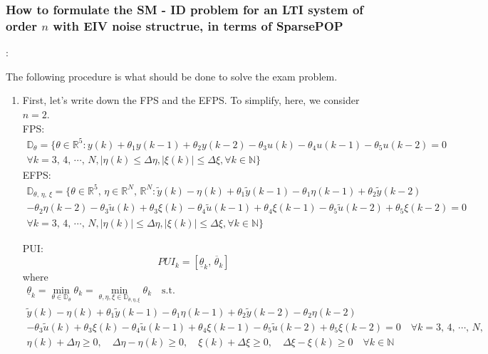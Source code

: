 \subsubsection{How to formulate the SM - ID problem for an LTI system of order $n$ with EIV noise structrue, in terms of SparsePOP}:\\
\begin{QandAbox}
The following procedure is what should be done to solve the exam problem.
\end{QandAbox}
\begin{enumerate}
\item First, let's write down the FPS and the EFPS. To simplify, here, we consider $n = 2$.\\
FPS:
\[
\begin{array}{c}
\mathbb{D}_\theta = \{\theta \in \mathbb{R}^5: y(k) + \theta_1 y(k-1) + \theta_2 y(k-2) - \theta_3 u(k) -\theta_4 u(k-1) -\theta_5 u(k-2) = 0 \\
\forall k = 3,\,4,\,\cdots,\,N, |\eta(k)\leq\Delta\eta, |\xi(k)|\leq \Delta\xi, \forall k \in \mathbb{N} 
\}
\end{array}
\]
EFPS:
\[
\begin{array}{l}
\mathbb{D}_{\theta,\,\eta,\,\xi}= \{\theta \in \mathbb{R}^5,\, \eta \in \mathbb{R}^N,\,\mathbb{R}^N
: 
\tilde{y}(k) - \eta(k)+ \theta_1 \tilde{y}(k-1) - \theta_1\eta(k-1) + \theta_2 \tilde{y}(k-2)\\-\theta_2\eta(k-2) - \theta_3 \tilde{u}(k) + \theta_3\xi(k) -\theta_4 \tilde{u}(k-1) + \theta_4\xi(k-1) -\theta_5 \tilde{u}(k-2) + \theta_5\xi(k-2) = 0 \\
\forall k = 3,\,4,\,\cdots,\,N,
|\eta(k)|\leq\Delta\eta, |\xi(k)|\leq \Delta\xi, \forall k \in \mathbb{N} 
\}
\end{array}
\]

PUI:
\[
PUI_k = \left[\underline{\theta}_k,\,\overline{\theta}_k \right]
\]
where
\[
\begin{array}{c}
\underline{\theta}_k = \min\limits_{\theta \in \mathbb{D}_\theta} \theta_k = \min\limits_{\theta, \eta, \xi \in \mathbb{D}_{\theta, \eta, \xi}} \theta_k \quad \text{s.t.} \\
\tilde{y}(k) - \eta(k) + \theta_1 \tilde{y}(k-1) - \theta_1\eta(k-1) + \theta_2 \tilde{y}(k-2) - \theta_2\eta(k-2) \\
- \theta_3 \tilde{u}(k) +\theta_3 \xi(k) - \theta_4 \tilde{u}(k-1) + \theta_4\xi(k-1) - \theta_5 \tilde{u}(k-2) + \theta_5 \xi(k-2) = 0 \quad \forall k = 3,\,4,\,\cdots,\,N,\\
\eta(k) + \Delta\eta \geq 0, \quad \Delta\eta - \eta(k) \geq 0, \quad \xi(k) + \Delta\xi \geq 0, \quad \Delta\xi - \xi(k) \geq 0 \quad \forall k \in \mathbb{N} 
\end{array}
\]


\end{enumerate}
